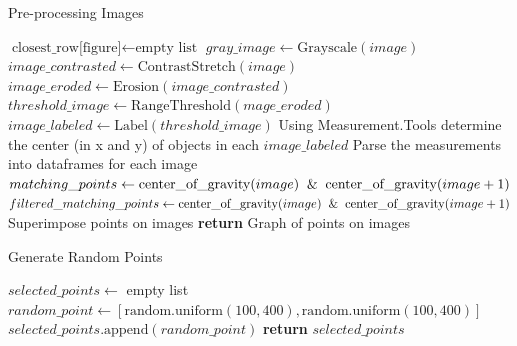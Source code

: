 \documentclass{article}
\begin{document}
\begin{algorithm}[h!]
\caption{Pre-processing Images}\label{cell-trace}
\begin{algorithmic}[1]
    \State $\text{closest\_row[figure]} \gets \text{empty list}$
        \State $gray\_image \gets \text{Grayscale}(image)$
        \State $image\_contrasted \gets \text{ContrastStretch}(image)$
        \State $image\_eroded \gets \text{Erosion}(image\_contrasted)$
        \State $threshold\_image \gets \text{RangeThreshold}(mage\_eroded)$
        \State $image\_labeled \gets \text{Label}(threshold\_image)$
        \State Using Measurement.Tools determine the center (in x and y) of objects in each $image\_labeled$
        \State Parse the measurements into dataframes for each image 
    \EndFor
        \State $matching\_points \gets \text{center\_of\_gravity}(image) \And \text{center\_of\_gravity}(image+1)$
        \State $filtered\_matching\_points \gets \text{center\_of\_gravity}(image) \And \text{center\_of\_gravity}(image+1)$
        \State Superimpose points on images
    \EndFor
    \State \textbf{return} Graph of points on images
\EndProcedure
\end{algorithmic}
\end{algorithm}

\begin{algorithm}[h!]
\caption{Generate Random Points}\label{generate-random-points}
\begin{algorithmic}[1]
    \State $selected\_points \gets$ empty list
        \State $random\_point \gets [\text{random.uniform}(100, 400), \text{random.uniform}(100, 400)]$
        \State $selected\_points.\text{append}(random\_point)$
    \EndFor
    \State \textbf{return} $selected\_points$
\EndFunction
\end{algorithmic}
\end{algorithm}
\end{document}
